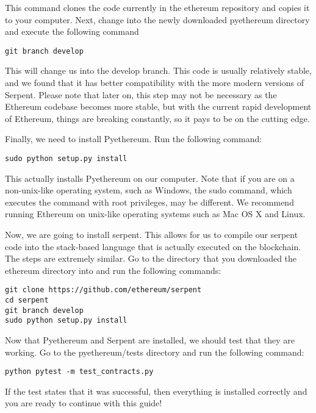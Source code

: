 \documentclass[12pt]{article}
\begin{document}
This command clones the code currently in the ethereum repository and copies it to your computer. Next, change into the newly downloaded pyethereum directory and execute the following command

\begin{lstlisting}
git branch develop
\end{lstlisting}

This will change us into the develop branch. This code is usually relatively stable, and we found that it has better compatibility with the more modern versions of Serpent. Please note that later on, this step may not be necessary as the Ethereum codebase becomes more stable, but with the current rapid development of Ethereum, things are breaking constantly, so it pays to be on the cutting edge.

Finally, we need to install Pyethereum. Run the following command:

\begin{lstlisting}
sudo python setup.py install
\end{lstlisting}

This actually installs Pyethereum on our computer. Note that if you are on a non-unix-like operating system, such as Windows, the sudo command, which executes the command with root privileges, may be different. We recommend running Ethereum on unix-like operating systems such as Mac OS X and Linux.

Now, we are going to install serpent. This allows for us to compile our serpent code into the stack-based language that is actually executed on the blockchain. The steps are extremely similar. Go to the directory that you downloaded the ethereum directory into and run the following commands:

\begin{lstlisting}
git clone https://github.com/ethereum/serpent
cd serpent
git branch develop
sudo python setup.py install
\end{lstlisting}

Now that Pyethereum and Serpent are installed, we should test that they are working. Go to the pyethereum/tests directory and run the following command:

\begin{lstlisting}
python pytest -m test_contracts.py
\end{lstlisting}

If the test states that it was successful, then everything is installed correctly and you are ready to continue with this guide!
\end{document}
